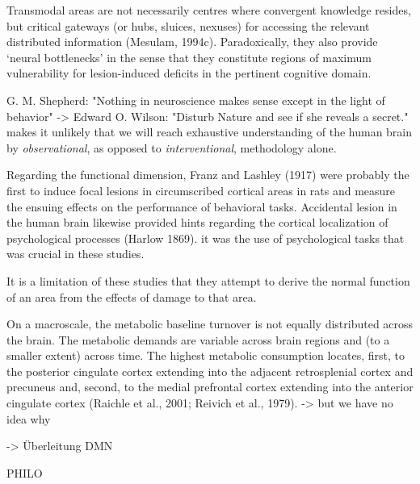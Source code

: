 \documentclass[authoryear,review,3p]{elsarticle}
\begin{document}
Transmodal areas are not necessarily centres where convergent knowledge resides, but critical gateways (or hubs, sluices, nexuses) for accessing the relevant distributed information (Mesulam, 1994c). Paradoxically, they also provide ‘neural bottlenecks’ in the sense that they constitute regions of maximum vulnerability for lesion-induced deficits in the pertinent cognitive domain.


G. M. Shepherd: "Nothing in neuroscience makes sense except in the light of behavior"
->
Edward O. Wilson: "Disturb Nature and see if she reveals a secret."
makes it unlikely that we will reach exhaustive understanding of
the human brain by
\textit{observational}, as opposed to \textit{interventional}, methodology
alone. 

Regarding the functional dimension, Franz and Lashley (1917) were probably the first to induce focal lesions in circumscribed cortical areas in rats and measure the ensuing effects on the performance of behavioral tasks. Accidental lesion in the human brain likewise provided hints regarding the cortical localization of psychological processes (Harlow 1869). 
it was the use of psychological tasks that was crucial in these studies.

It is a limitation of these studies that they attempt to derive the normal function of an area from the effects of damage to that area.

On a macroscale, the metabolic baseline turnover is not equally distributed across the brain. The metabolic demands are variable across brain regions and (to a smaller extent) across time. The highest metabolic consumption locates, first, to the posterior cingulate cortex extending into the adjacent retrosplenial cortex and precuneus and, second, to the medial prefrontal cortex extending into the anterior cingulate cortex (Raichle et al., 2001; Reivich et al., 1979).
-> but we have no idea why

-> Überleitung DMN



PHILO
\end{document}
